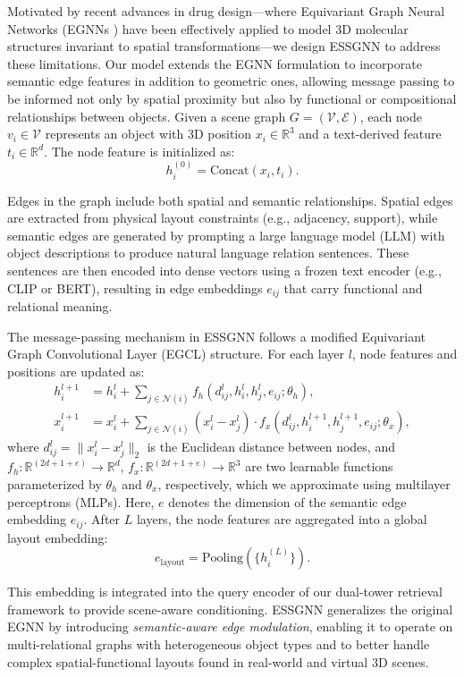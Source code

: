 Motivated by recent advances in drug design—where Equivariant Graph Neural Networks (EGNNs \cite{satorras2021n}) have been effectively applied to model 3D molecular structures invariant to spatial transformations—we design ESSGNN to address these limitations. Our model extends the EGNN formulation to incorporate semantic edge features in addition to geometric ones, allowing message passing to be informed not only by spatial proximity but also by functional or compositional relationships between objects. Given a scene graph \( G = (\mathcal{V}, \mathcal{E}) \), each node \( v_i \in \mathcal{V} \) represents an object with 3D position \( x_i \in \mathbb{R}^3 \) and a text-derived feature \( t_i \in \mathbb{R}^d \). The node feature is initialized as:
\[
    h_i^{(0)} = \text{Concat}(x_i, t_i).
\]

Edges in the graph include both spatial and semantic relationships. Spatial edges are extracted from physical layout constraints (e.g., adjacency, support), while semantic edges are generated by prompting a large language model (LLM) with object descriptions to produce natural language relation sentences. These sentences are then encoded into dense vectors using a frozen text encoder (e.g., CLIP or BERT), resulting in edge embeddings \( e_{ij} \) that carry functional and relational meaning.

The message-passing mechanism in ESSGNN follows a modified Equivariant Graph Convolutional Layer (EGCL) structure. For each layer \( l \), node features and positions are updated as:
\begin{align}
    h_i^{l+1} &= h_i^l + \sum_{j \in \mathcal{N}(i)} f_h(d_{ij}^l, h_i^l, h_j^l, e_{ij}; \theta_h), \\
    x_i^{l+1} &= x_i^l + \sum_{j \in \mathcal{N}(i)} (x_i^l - x_j^l) \cdot f_x(d_{ij}^l, h_i^{l+1}, h_j^{l+1}, e_{ij}; \theta_x),
\end{align}
where \( d_{ij}^l = \|x_i^l - x_j^l\|_2 \) is the Euclidean distance between nodes, and \( f_h: \mathbb{R}^{(2d + 1 + e)} \to \mathbb{R}^d \), \( f_x: \mathbb{R}^{(2d + 1 + e)} \to \mathbb{R}^{3} \) are two learnable functions parameterized by \( \theta_h \) and \( \theta_x \), respectively, which we approximate using multilayer perceptrons (MLPs). Here, \( e \) denotes the dimension of the semantic edge embedding \( e_{ij} \). After \( L \) layers, the node features are aggregated into a global layout embedding:
\[
    e_{\text{layout}} = \text{Pooling}(\{h_i^{(L)}\}).
\]

This embedding is integrated into the query encoder of our dual-tower retrieval framework to provide scene-aware conditioning. ESSGNN generalizes the original EGNN by introducing \textit{semantic-aware edge modulation}, enabling it to operate on multi-relational graphs with heterogeneous object types and to better handle complex spatial-functional layouts found in real-world and virtual 3D scenes.

